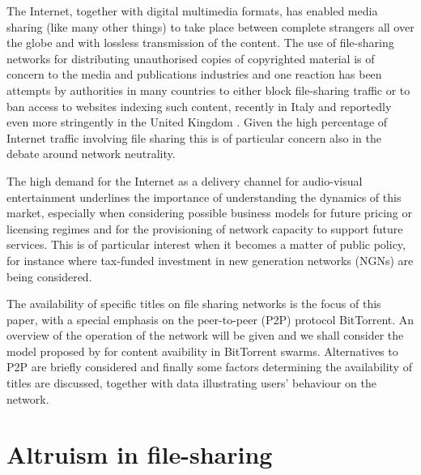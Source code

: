 \documentclass[12pt,english]{apa6}
\begin{document}
The Internet, together with digital multimedia formats, has enabled
media sharing (like many other things) to take place between complete
strangers all over the globe and with lossless transmission of the
content. The use of file-sharing networks for distributing unauthorised
copies of copyrighted material is of concern to the media and publications
industries \citep{doi:10.1080/01972240802189468} and one reaction
has been attempts by authorities in many countries to either block
file-sharing traffic or to ban access to websites indexing such content,
recently in Italy and reportedly even more stringently in the United
Kingdom \citep{arthur_internet_2010}. Given the high percentage of
Internet traffic involving file sharing \citep{gummadi_measurement_2003,menasche_content_2009,plissonneau_analysis_2005,pouwelse_pirates_2008}
this is of particular concern also in the debate around network neutrality.

‭The high demand for the Internet as a delivery channel for audio-visual
entertainment‭ \citep{alleman_next_2009} underlines the importance
of understanding the dynamics of this market,‭ especially when considering
possible business models for future pricing or licensing regimes‭
\citep{gervais_price_2004} and for the provisioning of network capacity
to support future services.‭ This is of particular interest when it
becomes a matter of public policy, for instance where tax-funded investment
in new generation networks (NGNs) are being considered. 

The availability of specific titles on file sharing networks is the
focus of this paper,‭ with a special emphasis on the peer-to-peer
(P2P) protocol BitTorrent. An overview of the operation of the network
will be given and we shall consider the model proposed by \citet{menasche_content_2009}
for content avaibility in BitTorrent swarms. Alternatives to P2P are
briefly considered and finally some factors determining the availability
of titles are discussed, together with data illustrating users' behaviour
on the network.


\section{Altruism in file-sharing}
\end{document}
